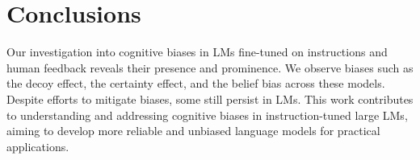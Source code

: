 \section{Conclusions}

Our investigation into cognitive biases in LMs fine-tuned on instructions and human feedback reveals their presence and prominence. We observe biases such as the decoy effect, the certainty effect, and the belief bias across these models.
Despite efforts to mitigate biases, some still persist in LMs.
This work contributes to understanding and addressing cognitive biases in instruction-tuned large LMs, aiming to develop more reliable and unbiased language models for practical applications.

